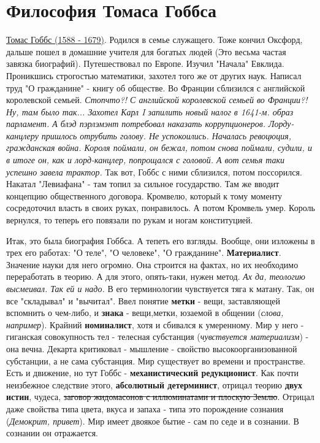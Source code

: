 \section{Философия Томаса Гоббса}
\underline{Томас Гоббс (1588 - 1679)}. Родился в семье служащего. Тоже кончил Оксфорд, дальше пошел в домашние учителя для богатых людей (Это весьма частая завязка биографий). Путешествовал по Европе.  Изучил "Начала" Евклида. Проникшись строгостью математики, захотел того же от других наук. Написал труд "О гражданине" - книгу об обществе. Во Франции сблизился с английской королевской семьей. \textit{Стопчто?! С английской королевской семьей во Франции?! Ну, там было так... Захотел Карл I запилить новый налог в 1641-м. образ парламент. А блэд  пэрлэмэнт потребовал наказать коррупционеров. Лорду-канцлеру пришлось отрубить голову. Не успокоились. Началась ревоцюция, гражданская война. Короля поймали, он бежал, потом снова поймали, судили, и в итоге он, как и лорд-канцлер, попрощался с головой. А вот семья таки успешно завела трактор.
} Так вот, Гоббс с ними сблизился, потом поссорился. Накатал "Левиафана" - там топил за сильное государство. Там же вводит концепцию общественного договора. Кромвелю, который к тому моменту сосредоточил власть в своих руках, понравилось. А потом Кромвель умер. Король вернулся, то теперь его повязали по рукам и ногам конституцией. 

Итак, это была биография Гоббса. А тепеть его взгляды. Вообще, они изложены в трех его работах: "О теле", "О человеке", "О гражданине". \textbf{Материалист}. Значение науки для него огромно. Она строится на фактах, но их необходимо переработать в теорию. А для этого, опять-таки, нужен метод. \textit{Ах да, теологию высмеивал. Так ей и надо.} В его терминологии чувствуется тяга к матану. Так, он все "складывал" и "вычитал". Ввел понятие \textbf{метки} - вещи, заставляющей вспомнить о чем-либо, и \textbf{знака} - вещи,метки, юзаемой в общении (\textit{слова, например}). Крайний \textbf{номиналист}, хотя и  сбивался к умеренному. Мир у него - гиганская совокупность тел - телесная субстанция (\textit{чувствуется материализм}) - она вечна. Декарта критиковал - мышление - свойство высокоорганизованной субстанции, а не сама субстанция. Мир существует во времени и пространстве. Есть и движение, но тут Гоббс - \textbf{механистический редукционист}. Как почти неизбежное следствие этого, \textbf{абсолютный детерминист}, отрицал теорию \textbf{двух истин}, чудеса, \sout{заговор жидомасонов с иллюминатами и плоскую Землю}. Отрицал даже свойства типа цвета, вкуса и запаха - типа это порождение сознания (\textit{Демокрит, привет}). Мир имеет двоякое бытие - сам по седе и в сознании. В сознании он отражается. 

